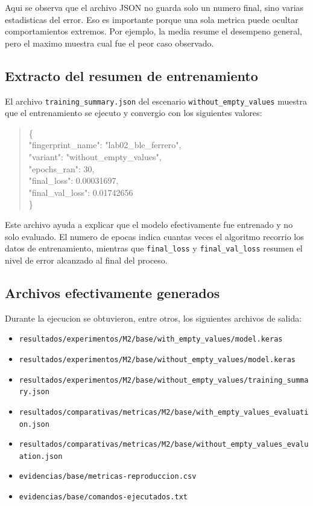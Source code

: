 \documentclass[11pt,a4paper]{article}
\begin{document}
Aqui se observa que el archivo JSON no guarda solo un numero final, sino varias estadisticas del error. Eso es importante porque una sola metrica puede ocultar comportamientos extremos. Por ejemplo, la media resume el desempeno general, pero el maximo muestra cual fue el peor caso observado.

\subsection*{Extracto del resumen de entrenamiento}
El archivo \texttt{training\_summary.json} del escenario \texttt{without\_empty\_values} muestra que el entrenamiento se ejecuto y convergio con los siguientes valores:

\begin{quote}
\ttfamily\footnotesize
\{\\
"fingerprint\_name": "lab02\_ble\_ferrero",\\
"variant": "without\_empty\_values",\\
"epochs\_ran": 30,\\
"final\_loss": 0.00031697,\\
"final\_val\_loss": 0.01742656\\
\}
\end{quote}

Este archivo ayuda a explicar que el modelo efectivamente fue entrenado y no solo evaluado. El numero de epocas indica cuantas veces el algoritmo recorrio los datos de entrenamiento, mientras que \texttt{final\_loss} y \texttt{final\_val\_loss} resumen el nivel de error alcanzado al final del proceso.

\subsection*{Archivos efectivamente generados}
Durante la ejecucion se obtuvieron, entre otros, los siguientes archivos de salida:
\begin{itemize}
\item \texttt{resultados/experimentos/M2/base/with\_empty\_values/model.keras}
\item \texttt{resultados/experimentos/M2/base/without\_empty\_values/model.keras}
\item \texttt{resultados/experimentos/M2/base/without\_empty\_values/training\_summary.json}
\item \texttt{resultados/comparativas/metricas/M2/base/with\_empty\_values\_evaluation.json}
\item \texttt{resultados/comparativas/metricas/M2/base/without\_empty\_values\_evaluation.json}
\item \texttt{evidencias/base/metricas-reproduccion.csv}
\item \texttt{evidencias/base/comandos-ejecutados.txt}
\end{itemize}
\end{document}
